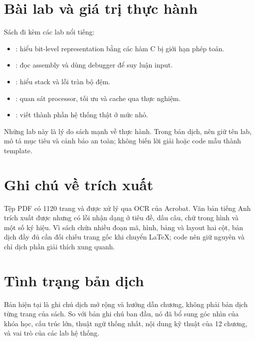 \documentclass[11pt]{article}
\begin{document}
\section{Bài lab và giá trị thực hành}

Sách đi kèm các lab nổi tiếng:
\begin{itemize}
  \item {}: hiểu bit-level representation bằng các hàm C bị giới
        hạn phép toán.
  \item {}: đọc assembly và dùng debugger để suy luận input.
  \item {}: hiểu stack và lỗi tràn bộ đệm.
  \item {}: quan sát processor, tối ưu và
        cache qua thực nghiệm.
  \item {}: viết thành phần hệ thống thật ở mức nhỏ.
\end{itemize}

Những lab này là lý do sách mạnh về thực hành. Trong bản dịch, nên giữ tên lab,
mô tả mục tiêu và cảnh báo an toàn; không biến lời giải hoặc code mẫu thành
template.

\section{Ghi chú về trích xuất}

Tệp PDF có 1120 trang và được xử lý qua OCR của Acrobat. Văn bản tiếng Anh
trích xuất được nhưng có lỗi nhận dạng ở tiêu đề, dấu câu, chữ trong hình và
một số ký hiệu. Vì sách chứa nhiều đoạn mã, hình, bảng và layout hai cột, bản
dịch đầy đủ cần đối chiếu trang gốc khi chuyển LaTeX; code nên giữ nguyên và
chỉ dịch phần giải thích xung quanh.

\section{Tình trạng bản dịch}

Bản hiện tại là ghi chú dịch mở rộng và hướng dẫn chương, không phải bản dịch
từng trang của sách. So với bản ghi chú ban đầu, nó đã bổ sung góc nhìn của
khóa học, cấu trúc lớn, thuật ngữ thống nhất, nội dung kỹ thuật của 12 chương,
và vai trò của các lab hệ thống.
\end{document}
